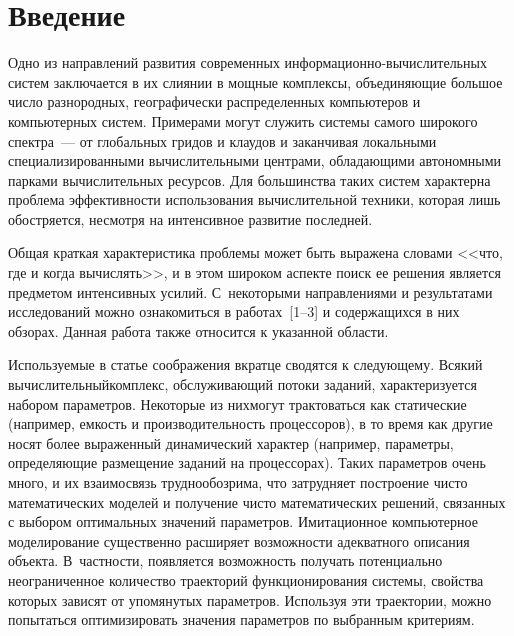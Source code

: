       \begin{multicols}{2}

            \label{st\stat}

\section{Введение}

  Одно из направлений развития современных 
  ин\-фор\-ма\-ци\-он\-но-вы\-чис\-ли\-тель\-ных сис\-тем заключается в 
их слиянии в мощные комплексы, объединяющие большое чис\-ло 
разнородных, географически распределенных компьютеров и 
компьютерных сис\-тем. Примерами могут служить системы самого широкого 
спектра~--- от глобальных гридов и клаудов и заканчивая локальными 
специализированными вычислительными центрами, обладающими 
автономными парками вычислительных ресурсов. Для большинства таких 
систем характерна проблема эффективности использования 
вычислительной техники, которая лишь обостряется, несмотря на 
интенсивное развитие последней. 

Общая краткая характеристика проблемы 
может быть выражена словами <<что, где и когда вычислять>>, и в этом 
широком аспекте поиск ее решения является предметом интенсивных 
усилий. С~некоторыми направлениями и результатами исследований можно 
ознакомиться в работах~[1--3] и содержащихся в них обзорах. Данная работа 
также относится к указанной области.
  
  Используемые в статье соображения вкратце сво\-дят\-ся к следующему. 
Всякий вычислительный\linebreak комплекс, обслуживающий потоки заданий, 
ха\-рак\-те\-ри\-зу\-ет\-ся набором параметров. Некоторые из них\linebreak могут трактоваться 
как статические (на\-при\-мер, емкость и производительность про\-цес\-со\-ров), в 
то время как другие носят более выраженный динамический характер 
(например, па\-ра\-мет\-ры, определяющие размещение заданий на процессорах). 
Таких параметров очень много, и их взаимосвязь труднообозрима, что 
затрудняет построение чисто математических моделей и получение чисто 
математических решений, связанных с выбором оптимальных значений 
параметров. Имитационное компьютерное моделирование существенно 
расширяет возможности адекватного описания объекта. В~част\-ности, 
появляется возможность получать потенциально неограниченное 
количество траекторий функционирования системы, свойства которых 
зависят от упомянутых параметров. Используя эти траектории, можно 
попытаться оптимизировать значения параметров по выбранным 
критериям.
  

\end{multicols}
